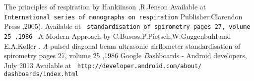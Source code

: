 \documentclass{article}
\begin{document}
\begin{thebibliography}{10}
 The principles of respiration  by Hankiinson ,R.Jenson 
Available at \texttt{ International series of monographs on respiration}
Publisher:Clarendon Press ,2005). 
Available at \texttt{  standardisation of spirometry pages 27, volume 25 ,1986 }
A Modern Approach by C.Busess,P.Pietsch,W.Guggenbuhl and E.A.Koller .
 \emph  A pulsed diagonal beam ultrasonic airflometer  standardisation of spirometry pages 27, volume 25 ,1986
 Google
\emph  Dashboards - Android developers, July 2013
Available at \texttt{ http://developer.android.com/about/ dashboards/index.html }
\end{thebibliography}
\end{document}

